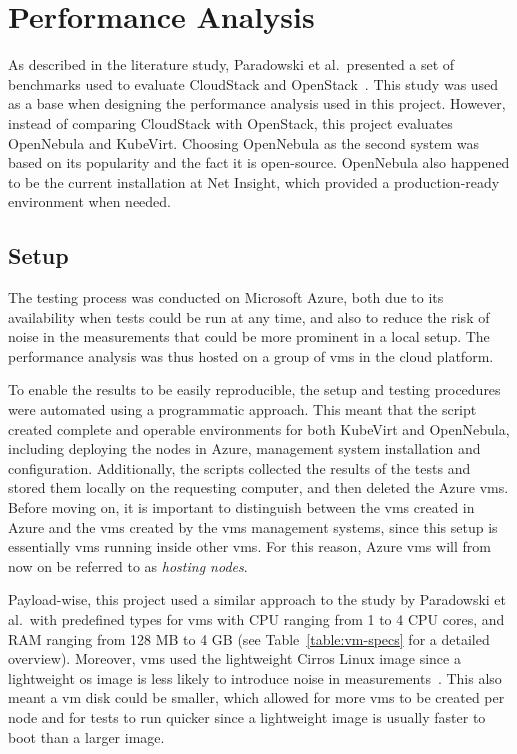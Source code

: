 \documentclass{kththesis}
\begin{document}
\chapter{Performance Analysis}
As described in the literature study, Paradowski et al.\ presented a set of benchmarks used to evaluate CloudStack and OpenStack\ \cite{cs-os-comparison-2013}. This study was used as a base when designing the performance analysis used in this project. However, instead of comparing CloudStack with OpenStack, this project evaluates OpenNebula and KubeVirt. Choosing OpenNebula as the second system was based on its popularity and the fact it is open-source. OpenNebula also happened to be the current installation at Net Insight, which provided a production-ready environment when needed.

\section{Setup}
The testing process was conducted on Microsoft Azure, both due to its availability when tests could be run at any time, and also to reduce the risk of noise in the measurements that could be more prominent in a local setup. The performance analysis was thus hosted on a group of \Glspl{vm} in the cloud platform. 

To enable the results to be easily reproducible, the setup and testing procedures were automated using a programmatic approach. This meant that the script created complete and operable environments for both KubeVirt and OpenNebula, including deploying the nodes in Azure, management system installation and configuration. Additionally, the scripts collected the results of the tests and stored them locally on the requesting computer, and then deleted the Azure \Glspl{vm}. Before moving on, it is important to distinguish between the \Glspl{vm} created in Azure and the \Glspl{vm} created by the \Glspl{vm} management systems, since this setup is essentially \Glspl{vm} running inside other \Glspl{vm}. For this reason, Azure \Glspl{vm} will from now on be referred to as \textit{hosting nodes}.

Payload-wise, this project used a similar approach to the study by Paradowski et al.\ with predefined types for \Glspl{vm} with CPU ranging from 1 to 4 CPU cores, and RAM ranging from 128 MB to 4 GB (see Table\ \ref{table:vm-specs} for a detailed overview). Moreover, \Glspl{vm} used the lightweight Cirros Linux image since a lightweight \Gls{os} image is less likely to introduce noise in measurements\ \cite{linux-boot-time}. This also meant a \Gls{vm} disk could be smaller, which allowed for more \Glspl{vm} to be created per node and for tests to run quicker since a lightweight image is usually faster to boot than a larger image.
\end{document}
